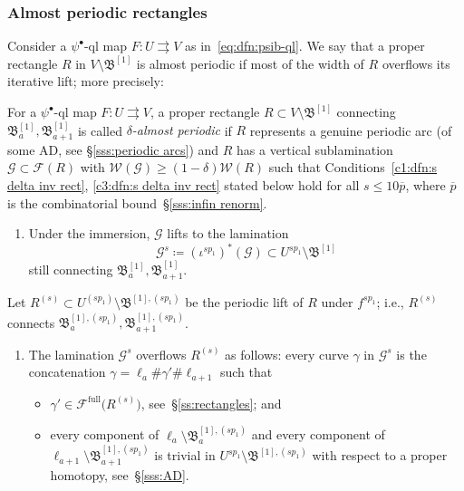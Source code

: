 \documentclass{amsart}
\newcommand\full{{\operatorname{full}}}
\newcommand{\bush}{{\mathfrak B }}
\newcommand{\bbush}{{\boldsymbol {\mathfrak B} }}
\newcommand{\1}{{\mathbb 1 }}
\newcommand{\Fam}{{\mathcal F}}
\newcommand{\FamG}{{\mathcal G}}
\newcommand{\Width}{{\mathcal W}}
\begin{document}
\subsubsection{Almost periodic rectangles} \label{sss:PeriodRect} Consider a $\psi^\bullet$-ql map $F\colon U \rightrightarrows V$ as in~\eqref{eq:dfn:psib-ql}. We say that a proper rectangle $R$ in $V\setminus \bbush^{[1]}$ is almost periodic if most of the width of $R$ overflows its iterative lift; more precisely:





\begin{defn}
\label{dfn:s delta inv rect} 
For a $\psi^\bullet$-ql map $F\colon U \rightrightarrows V$, a proper rectangle $R\subset V\setminus \bbush^{[1]}$ connecting $\bush^{[1]}_a,\bush^{[1]}_{a+1}$ is called \emph{$\delta$-almost periodic} if $R$ represents a genuine periodic arc (of some AD, see \S\ref{sss:periodic arcs}) and $R$ has a vertical sublamination $\FamG\subset \Fam(R)$ with $\Width(\FamG)\ge (1-\delta)\Width(R)$ such that Conditions~\ref{c1:dfn:s delta inv rect}, \ref{c3:dfn:s delta inv rect} stated below hold for all $s\le 10 \overline p$, where $\overline p$ is the combinatorial bound~\S\ref{sss:infin renorm}.
\begin{enumerate}[label=\text{(\Roman*)},font=\normalfont,leftmargin=*]
\item \label{c1:dfn:s delta inv rect} Under the immersion, $\FamG$ lifts to the lamination \[\FamG^s\coloneqq (\iota^{sp_1})^*(\FamG)\subset U^{sp_1}\setminus \bbush^{[1]}\] still connecting $\bush^{[1]}_a,\bush^{[1]}_{a+1}$.
\end{enumerate}
Let $R^{(s)}\subset U^{(sp_1)}\setminus \bbush^{[1],(sp_1)}$ be the periodic lift of $R$ under $f^{s p_1}$; i.e., $R^{(s)}$ connects $\bush^{[1],(sp_1)}_a,\bush^{[1],(sp_1)}_{a+1}$.
\begin{enumerate}[label=\text{(\Roman*)},start=2,font=\normalfont,leftmargin=*]
\item \label{c3:dfn:s delta inv rect} The lamination $\FamG^s$ overflows $R^{(s)}$ as follows: every curve $\gamma$ in $\FamG^s$ is the concatenation $\gamma=\ell_a\#\gamma'\#\ell_{a+1}$ such that 
\begin{itemize}
\item $\gamma'\in \Fam^\full\big(R^{(s)}\big)$, see~\S\ref{ss:rectangles}; and
\item every component of $\ell_a\setminus \bush^{[1],(sp_1)}_a$ and every component of $\ell_{a+1}\setminus \bush^{[1],(sp_1)}_{a+1}$ is trivial in $U^{sp_1}\setminus \bbush^{[1],(sp_1)}$  with respect to a proper homotopy, see~\S\ref{sss:AD}.
\end{itemize}
\end{enumerate}
\end{defn} 
\end{document}
